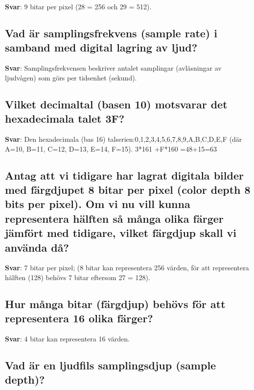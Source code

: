\documentclass[a4paper,11pt,oneside]{article}
\begin{document}
\begin{sloppypar}
\textbf{Svar}: 9 bitar per pixel (28 = 256 och 29 = 512).



\subsection{Vad \"ar samplingsfrekvens (sample rate) i samband med digital lagring av ljud?}

\label{q:77:sa:sv:True}

\textbf{Svar}: Samplingsfrekvensen beskriver antalet samplingar (avl\"asningar av ljudv\r{a}gen) som g\"ors per tidsenhet (sekund).



\subsection{Vilket decimaltal (basen 10) motsvarar det hexadecimala talet 3F?}

\label{q:78:sa:sv:True}

\textbf{Svar}: Den hexadecimala (bas 16) talserien:0,1,2,3,4,5,6,7,8,9,A,B,C,D,E,F (d\"ar A=10, B=11, C=12, D=13, E=14, F=15). 3*161 +F*160 =48+15=63



\subsection{Antag att vi tidigare har lagrat digitala bilder med f\"argdjupet 8 bitar per pixel (color depth 8 bits per pixel). Om vi nu vill kunna representera h\"alften s\r{a} m\r{a}nga olika f\"arger j\"amf\"ort med tidigare, vilket f\"argdjup skall vi anv\"anda d\r{a}?}

\label{q:79:sa:sv:True}

\textbf{Svar}: 7 bitar per pixel; (8 bitar kan representera 256 v\"arden, f\"or att representera h\"alften (128) beh\"ovs 7 bitar eftersom 27 = 128).



\subsection{Hur m\r{a}nga bitar (f\"argdjup) beh\"ovs f\"or att representera 16 olika f\"arger?}

\label{q:80:sa:sv:True}

\textbf{Svar}: 4 bitar kan representera 16 v\"arden.



\subsection{Vad \"ar en ljudfils samplingsdjup (sample depth)?}


\end{sloppypar}
\end{document}
